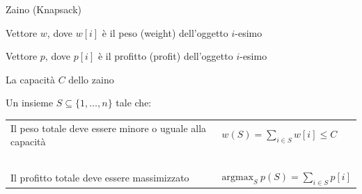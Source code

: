 \begin{frame}{Zaino (Knapsack)}

\vspace{-9pt}
\begin{myboxtitle}[Input]
\BIL
\item Vettore $w$, dove \alert{$w[i]$} è il \alert{peso} (\alert{weight}) dell'oggetto $i$-esimo
\item Vettore $p$, dove \alert{$p[i]$} è il \alert{profitto} (\alert{profit}) dell'oggetto $i$-esimo
\item La \alert{capacità} $C$ dello zaino
\EIL
\end{myboxtitle}

\begin{myboxtitle}[Output]
Un insieme $S \subseteq \{1, \ldots, n\}$ tale che:

\medskip
\begin{tabular}{P{5cm}P{5cm}}
Il \alert{peso totale} deve essere minore o uguale alla capacità &

$w(S) = \sum_{i \in S} w[i] \leq C$
\\
~\\
Il \alert{profitto totale} deve essere massimizzato &
$
\textrm{argmax}_S \ p(S) = \sum_{i \in S} p[i]
$
\\
\end{tabular}
\end{myboxtitle}

\end{frame}

